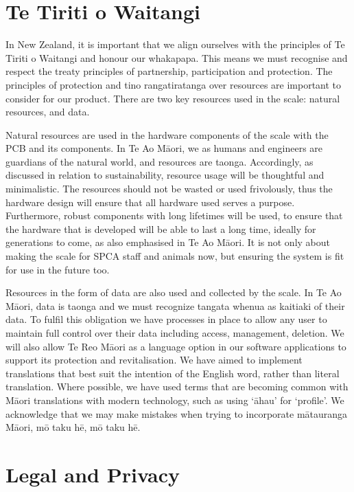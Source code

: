 \section{Te Tiriti o Waitangi}

In New Zealand, it is important that we align ourselves with the principles of Te Tiriti o Waitangi and honour our whakapapa. This means we must recognise and respect the treaty principles of partnership, participation and protection. The principles of protection and tino rangatiratanga over resources are important to consider for our product. There are two key resources used in the scale: natural resources, and data. 

Natural resources are used in the hardware components of the scale with the PCB and its components. In Te Ao Māori, we as humans and engineers are guardians of the natural world, and resources are taonga. Accordingly, as discussed in relation to sustainability, resource usage will be thoughtful and minimalistic. The resources should not be wasted or used frivolously, thus the hardware design will ensure that all hardware used serves a purpose. Furthermore, robust components with long lifetimes will be used, to ensure that the hardware that is developed will be able to last a long time, ideally for generations to come, as also emphasised in Te Ao Māori. It is not only about making the scale for SPCA staff and animals now, but ensuring the system is fit for use in the future too.

Resources in the form of data are also used and collected by the scale. In Te Ao Māori, data is taonga and we must recognize tangata whenua as kaitiaki of their data. To fulfil this obligation we have processes in place to allow any user to maintain full control over their data including access, management, deletion. We will also allow Te Reo Māori as a language option in our software applications to support its protection and revitalisation. We have aimed to implement translations that best suit the intention of the English word, rather than literal translation. Where possible, we have used terms that are becoming common with Māori translations with modern technology, such as using ‘āhau’ for ‘profile’. We acknowledge that we may make mistakes when trying to incorporate mātauranga Māori, mō taku hē, mō taku hē.

\section{Legal and Privacy}


